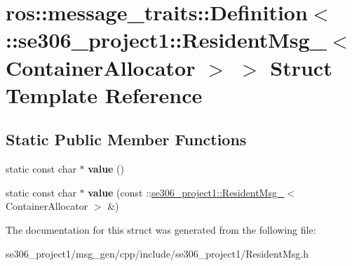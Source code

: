 \hypertarget{structros_1_1message__traits_1_1Definition_3_01_1_1se306__project1_1_1ResidentMsg___3_01ContainerAllocator_01_4_01_4}{\section{ros\-:\-:message\-\_\-traits\-:\-:Definition$<$ \-:\-:se306\-\_\-project1\-:\-:Resident\-Msg\-\_\-$<$ Container\-Allocator $>$ $>$ Struct Template Reference}
\label{structros_1_1message__traits_1_1Definition_3_01_1_1se306__project1_1_1ResidentMsg___3_01ContainerAllocator_01_4_01_4}
}
\subsection*{Static Public Member Functions}
\begin{DoxyCompactItemize}
\item 
\hypertarget{structros_1_1message__traits_1_1Definition_3_01_1_1se306__project1_1_1ResidentMsg___3_01ContainerAllocator_01_4_01_4_a7456e6595722ccfcad34cb29b1c76d2b}{static const char $\ast$ {\bfseries value} ()}\label{structros_1_1message__traits_1_1Definition_3_01_1_1se306__project1_1_1ResidentMsg___3_01ContainerAllocator_01_4_01_4_a7456e6595722ccfcad34cb29b1c76d2b}

\item 
\hypertarget{structros_1_1message__traits_1_1Definition_3_01_1_1se306__project1_1_1ResidentMsg___3_01ContainerAllocator_01_4_01_4_a9036589abcf9b2afa910914cac0d57a8}{static const char $\ast$ {\bfseries value} (const \-::\hyperlink{structse306__project1_1_1ResidentMsg__}{se306\-\_\-project1\-::\-Resident\-Msg\-\_\-}$<$ Container\-Allocator $>$ \&)}\label{structros_1_1message__traits_1_1Definition_3_01_1_1se306__project1_1_1ResidentMsg___3_01ContainerAllocator_01_4_01_4_a9036589abcf9b2afa910914cac0d57a8}

\end{DoxyCompactItemize}


The documentation for this struct was generated from the following file\-:\begin{DoxyCompactItemize}
\item 
se306\-\_\-project1/msg\-\_\-gen/cpp/include/se306\-\_\-project1/Resident\-Msg.\-h\end{DoxyCompactItemize}
